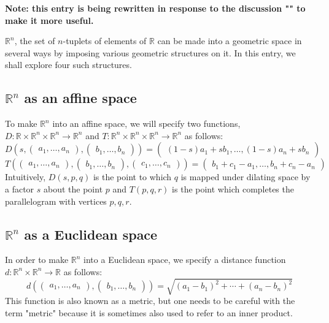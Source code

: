 \documentclass{article}
\begin{document}
{\bf Note: this entry is being rewritten in response to the discussion "" to make it more useful.}

$\mathbb{R}^n$, the set of $n$-tuplets of elements of $\mathbb{R}$ can be made into a geometric space in several ways by imposing various geometric structures on it.  In this entry, we shall explore four such structures.

\subsection{$\mathbb{R}^n$ as an affine space}

To make $\mathbb{R}^n$ into an affine space, we will specify two functions, $D \colon \mathbb{R} \times \mathbb{R}^n \times \mathbb{R}^n \to \mathbb{R}^n$ and $T \colon \mathbb{R}^n \times \mathbb{R}^n \times \mathbb{R}^n \to \mathbb{R}^n$ as follows:
 $$D \left( s, \begin{pmatrix} a_1, \ldots,  a_n \end{pmatrix}, \begin{pmatrix} b_1, \ldots, b_n \end{pmatrix} \right) = \begin{pmatrix} (1-s) a_1 + s b_1, \ldots,  (1-s) a_n + s b_n \end{pmatrix}$$
 $$T \left( \begin{pmatrix} a_1, \ldots,  a_n \end{pmatrix}, \begin{pmatrix} b_1, \ldots, b_n \end{pmatrix}, \begin{pmatrix} c_1, \ldots, c_n \end{pmatrix} \right) = \begin{pmatrix} b_1 + c_1 - a_1, \ldots, b_n + c_n - a_n \end{pmatrix}$$
Intuitively, $D (s,p,q)$ is the point to which $q$ is mapped under dilating space by a factor $s$ about the point $p$ and $T(p,q,r)$ is the point which completes the parallelogram with vertices $p,q,r$.

\subsection{$\mathbb{R}^n$ as a Euclidean space}

In order to make $\mathbb{R}^n$ into a Euclidean space, we specify a distance function $d \colon \mathbb{R}^n \times \mathbb{R}^n \to \mathbb{R}$ as follows:
 \[d \left( \begin{pmatrix} a_1, \ldots,  a_n \end{pmatrix}, \begin{pmatrix} b_1, \ldots, b_n \end{pmatrix} \right) = \sqrt{ (a_1-b_1)^2 + \cdots + (a_n-b_n)^2 }\]
This function is also known as a metric, but one needs to be careful with the term "metric" because it is sometimes also used to refer to an inner product.
\end{document}
